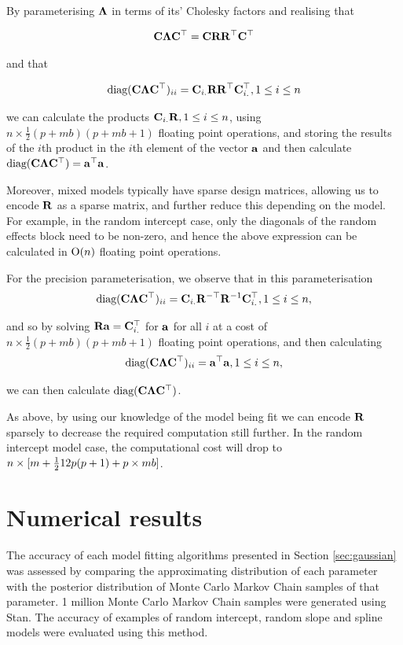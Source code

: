 \documentclass{amsart}[12pt]
\begin{document}
	By parameterising ${\boldsymbol \Lambda}$ in terms of its' Cholesky factors and realising that
	
	\[
		{\bf C} {\boldsymbol \Lambda} {\bf C}^\top = {\bf C} {\bf R} {\bf R}^\top {\bf C}^\top
	\]
	
	\noindent and that
	
	\[
		\text{diag}({\bf C} {\boldsymbol \Lambda} {\bf C}^\top)_{ii} = {\bf C}_{i .} {\bf R} {\bf R}^\top {\bf C}_{i .}^\top, 1 \leq i \leq n
	\]
	
	\noindent we can calculate the products ${\bf C}_{i .} {\bf R}, 1 \leq i \leq n$, using $n \times \frac{1}{2}(p + m
	b)(p + m b   + 1)$ floating point operations, and storing the results of the $i$th product in the $i$th
	element of the   vector ${\bf a}$ and then calculate $\text{diag}({\bf C} {\boldsymbol \Lambda} {\bf C}^\top) = {\bf a}^\top {\bf a}$.
	
	Moreover, mixed models typically have sparse design matrices, allowing us to encode ${\bf R}$ as a sparse matrix, and	further reduce   this depending on the model. For example, in the random intercept case, only the diagonals of the random effects block need to be non-zero, and hence the above expression can be calculated in
	$\text{O}(n)$ floating point operations.
	
	
	For the precision parameterisation, we observe that in this parameterisation
	\[
		\text{diag}({\bf C} {\boldsymbol \Lambda} {\bf C}^\top)_{ii} = {\bf C}_{i .} {\bf R}^{-\top} {\bf R}^{-1} {\bf C}_{i .}^\top, 1 \leq i \leq n,
	\]
	
  \noindent and so by solving ${\bf R} {\bf a} = {\bf C}_{i .}^\top$ for ${\bf a}$ for all $i$ at a cost of $n \times
	\frac{1}{2} (p + m b) (p + m b + 1)$ floating point operations, and then calculating
	\[
		\text{diag}({\bf C} {\boldsymbol \Lambda} {\bf C}^\top)_{ii} = {\bf a}^\top {\bf a}, 1 \leq i \leq n,
	\]
	
	\noindent we can then calculate $\text{diag}({\bf C} {\boldsymbol \Lambda} {\bf C}^\top)$.
	
	As above, by using our knowledge of the model being fit we can encode ${\bf R}$ sparsely to decrease
	the required   computation still further. In the random intercept model case, the computational cost will drop
	to   $n \times [m + \tfrac{1}{2}{1}{2} p (p + 1) + p \times m b]$.
	
	\section{Numerical results}
	\label{sec:results}
		
	The accuracy of each model fitting algorithms presented in Section \ref{sec:gaussian} was assessed by
	comparing the approximating distribution of each parameter with the posterior distribution of Monte Carlo
	Markov Chain samples of that parameter. 1 million Monte Carlo Markov Chain samples were generated using Stan.
	The accuracy of examples of random intercept, random slope and spline models were evaluated using this method.
		
\end{document}
